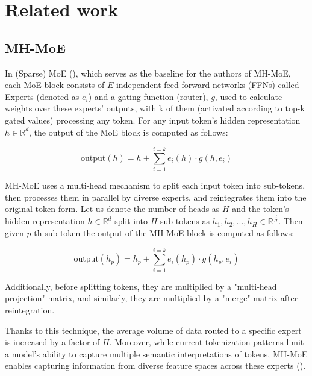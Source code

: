 \documentclass[12pt]{article}
\begin{document}
\section{Related work}

\subsection{MH-MoE} 
In (Sparse) MoE (\cite{shazeer2017outrageously}), which serves as the baseline for the authors of MH-MoE, each MoE block consists of $E$ independent feed-forward networks (FFNs) called Experts (denoted as $e_i$​) and a gating function (router), $g$, used to calculate weights over these experts' outputs, with k of them (activated according to top-k gated values) processing any token. For any input token's hidden representation $h \in \mathbb{R}^d$, the output of the MoE block is computed as follows:

\[ \text{output}(h)=h+\sum_{i=1}^{i=k} e_i (h)  \cdot g(h, e_i)\]

MH-MoE uses a multi-head mechanism to split each input token into sub-tokens, then processes them in parallel by diverse experts, and reintegrates them into the original token form. Let us denote the number of heads as $H$ and the token's hidden representation $h \in \mathbb{R}^d $ split into $H$ sub-tokens as $h_1,h_2,...,h_H \in \mathbb{R}^{\frac{d}{H}} $. Then given $p$-th sub-token the output of the MH-MoE block is computed as follows:

\[ \text{output}(h_p)= h_p + \sum_{i=1}^{i=k} e_i (h_p)  \cdot g(h_p,e_i)\]

Additionally, before splitting tokens, they are multiplied by a "multi-head projection" matrix, and similarly, they are multiplied by a "merge" matrix after reintegration.

Thanks to this technique, the average volume of data routed to a specific expert is increased by a factor of $H$. Moreover, while current tokenization patterns limit a model's ability to capture multiple semantic interpretations of tokens, MH-MoE enables capturing information from diverse feature spaces across these experts (\cite{wu2024multihead}).
\end{document}
